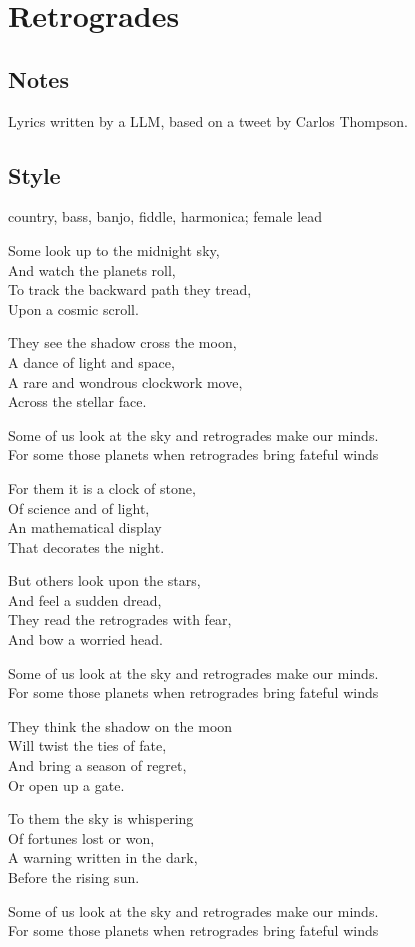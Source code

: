 \section{Retrogrades}

\subsection{Notes}
Lyrics written by a LLM, based on a tweet by Carlos Thompson.

\subsection{Style}
country, bass, banjo, fiddle, harmonica; female lead

\begin{lyrics}
Some look up to the midnight sky,\\
And watch the planets roll,\\
To track the backward path they tread,\\
Upon a cosmic scroll.

They see the shadow cross the moon,\\
A dance of light and space,\\
A rare and wondrous clockwork move,\\
Across the stellar face.

Some of us look at the sky and retrogrades make our minds.\\
For some those planets when retrogrades bring fateful winds

For them it is a clock of stone,\\
Of science and of light,\\
An mathematical display\\
That decorates the night.

But others look upon the stars,\\
And feel a sudden dread,\\
They read the retrogrades with fear,\\
And bow a worried head.

Some of us look at the sky and retrogrades make our minds.\\
For some those planets when retrogrades bring fateful winds

They think the shadow on the moon\\
Will twist the ties of fate,\\
And bring a season of regret,\\
Or open up a gate.

To them the sky is whispering\\
Of fortunes lost or won,\\
A warning written in the dark,\\
Before the rising sun.

Some of us look at the sky and retrogrades make our minds.\\
For some those planets when retrogrades bring fateful winds

\end{lyrics}

